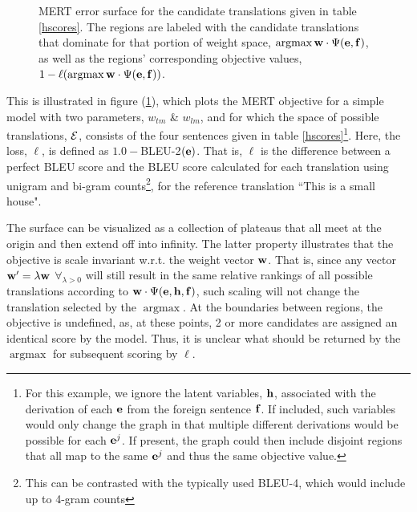 \documentclass[11pt]{article}
\DeclareMathOperator*{\argmax}{argmax}
\begin{document}
\begin{figure}[h]
\vskip 0.2in
\begin{center}
\setlength{\epsfxsize}{3.0in}
\centerline{}
\vskip -0.15in
\caption{MERT error surface for the candidate translations given in table \ref{hscores}. The regions are labeled with the candidate translations that dominate for that portion of weight space, $\argmax {\bf w} \cdot \Psi({\bf e}, {\bf f})$, as well as the regions' corresponding objective values, $1-\ell(\argmax {\bf w} \cdot \Psi({\bf e}, {\bf f}))$. 
\label{mertsurface}
}
\end{center}
\vskip -0.2in
\end{figure}


This is illustrated in figure (\ref{mertsurface}), which plots the MERT objective for a simple model with two parameters, $w_{tm}$ \& $w_{lm}$, and for which the space of possible translations, ${\cal E}$, consists of the four sentences given in table \ref{hscores}\footnote{For this example, we ignore the latent variables, ${\bf h}$, associated with the derivation of each ${\bf e}$ from the foreign sentence ${\bf f}$. If included, such variables would only change the graph in that  multiple different derivations would be possible for each ${\bf e}^j$. If present, the graph could then include disjoint regions that all map to the same ${\bf e}^j$ and thus the same objective value.}. Here, the loss, $\ell$, is defined as $1.0 - $BLEU-2$({\bf e})$. That is, $\ell$ is the difference between a perfect BLEU score and the BLEU score calculated for each translation using unigram and bi-gram counts\footnote{This can be contrasted with the typically used BLEU-4, which would include up to 4-gram counts}, for the reference translation ``This is a small house". 

The surface can be visualized as a collection of plateaus that all meet at the origin and then extend off into infinity. The latter property illustrates that the objective is scale invariant w.r.t. the weight vector ${\bf w}$. That is, since any vector ${\bf w}^\prime = \lambda {\bf w}$ $\forall_{\lambda > 0}$ will still result in the same relative rankings of all possible translations according to ${\bf w} \cdot \Psi({\bf e}, {\bf h}, {\bf f})$, such scaling will not change the translation selected by the $\argmax$. At the boundaries between regions, the objective is undefined, as, at these points, 2 or more candidates are assigned an identical score by the model. Thus, it is unclear what should be returned by the $\argmax$ for subsequent scoring by $\ell$.
\end{document}
